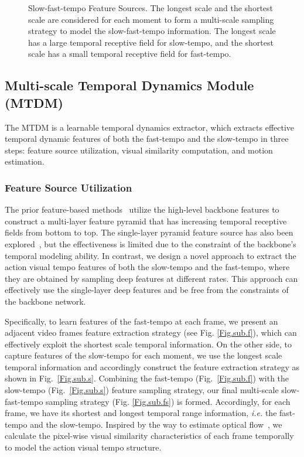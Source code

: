 \documentclass[journal]{IEEEtran}
\begin{document}
\begin{figure*}[tbp]
\caption{Slow-fast-tempo Feature Sources. The longest scale and the shortest scale are considered for each moment to form a multi-scale sampling strategy to model the slow-fast-tempo information. The longest scale has a large temporal receptive field for slow-tempo, and the shortest scale has a small temporal receptive field for fast-tempo.}
\label{fig:corr}
\end{figure*}

\subsection{Multi-scale Temporal Dynamics Module (MTDM)}
The MTDM is a learnable temporal dynamics extractor, which extracts effective temporal dynamic features of both the fast-tempo and the slow-tempo in three steps: feature source utilization, visual similarity computation, and motion estimation.

\subsubsection{Feature Source Utilization}
The prior feature-based methods~\cite{yang2020temporal} utilize the high-level backbone features to construct a multi-layer feature pyramid that has increasing temporal receptive fields from bottom to top. The single-layer pyramid feature source has also been explored~\cite{yang2020temporal}, but the effectiveness is limited due to the constraint of the backbone's temporal modeling ability. In contrast, we design a novel approach to extract the action visual tempo features of both the slow-tempo and the fast-tempo, where they are obtained by sampling deep features at different rates. This approach can effectively use the single-layer deep features and be free from the constraints of the backbone network.

Specifically, to learn features of the fast-tempo at each frame, we present an adjacent video frames feature extraction strategy (see Fig. \ref{Fig.sub.f}), which can effectively exploit the shortest scale temporal information. On the other side, to capture features of the slow-tempo for each moment, we use the longest scale temporal information and accordingly construct the feature extraction strategy as shown in Fig.~\ref{Fig.sub.s}. Combining the fast-tempo (Fig.~\ref{Fig.sub.f}) with the slow-tempo (Fig.~\ref{Fig.sub.s}) feature sampling strategy, our final multi-scale slow-fast-tempo sampling strategy (Fig. \ref{Fig.sub.fs}) is formed. Accordingly, for each frame, we have its shortest and longest temporal range information, \textit{i.e.} the fast-tempo and the slow-tempo. Inspired by the way to estimate optical flow~\cite{tu2019survey,t2020Young}, we calculate the pixel-wise visual similarity characteristics of each frame temporally to model the action visual tempo structure.
\end{document}
